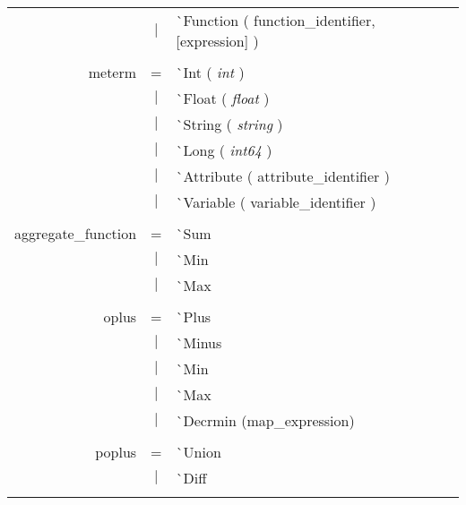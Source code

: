 \documentclass{article}
\begin{document}
\begin{tabular}[ht] {rcl}
&$\lvert$ & \`{}Function ( function\_identifier, [expression] )\\
\\
meterm &=& \`{}Int ( \emph{int} )\\
&$\lvert$ & \`{}Float ( \emph{float} )\\
&$\lvert$ & \`{}String ( \emph{string} )\\
&$\lvert$ & \`{}Long ( \emph{int64} )\\
&$\lvert$ & \`{}Attribute ( attribute\_identifier )\\
&$\lvert$ & \`{}Variable ( variable\_identifier )\\
\\
aggregate\_function &=& \`{}Sum\\
&$\lvert$ & \`{}Min \\
&$\lvert$ & \`{}Max \\
\\
oplus &=& \`{}Plus \\
&$\lvert$ & \`{}Minus \\
&$\lvert$ & \`{}Min\\
&$\lvert$ & \`{}Max\\
&$\lvert$ & \`{}Decrmin (map\_expression)\\
\\
poplus &=& \`{}Union\\
&$\lvert$ & \`{}Diff\\
\\
\end{tabular}
\pagebreak
\end{document}
